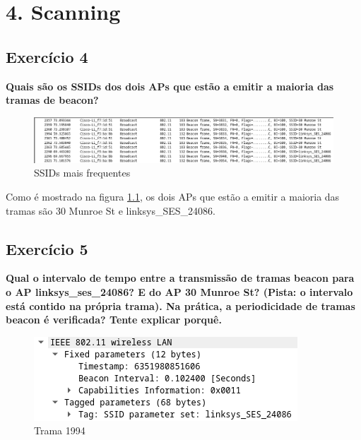 \documentclass[a4paper]{report}
\begin{document}
\chapter{4. Scanning}
\section{Exercício 4}
\textbf{Quais são os SSIDs dos dois APs que estão a emitir a maioria das tramas
de beacon?}

\begin{figure}[H]
    \centering 
    \includegraphics[width=\textwidth]{images/SSIDsEx4.png}  
    \caption{SSIDs mais frequentes}
    \label{fig:SSIDsEx4}
\end{figure}
Como é mostrado na figura \ref{fig:SSIDsEx4}, os dois APs que estão a emitir a
maioria das tramas são 30 Munroe St e linksys\_SES\_24086.

\section{Exercício 5}
\textbf{Qual o intervalo de tempo entre a transmissão de tramas beacon para o AP
linksys\_ses\_24086? E do AP 30 Munroe St? (Pista: o intervalo está contido na
própria trama). Na prática, a periodicidade de tramas beacon é verificada?
Tente explicar porquê.}

\begin{figure}[H]
    \centering 
    \includegraphics[width=\textwidth]{images/tramaLinkEx5.png}  
    \caption{Trama 1994}
    \label{fig:tramaLinkEx5}
\end{figure}
\end{document}
